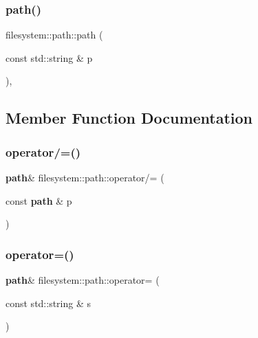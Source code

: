 \subsubsection{path()\hspace{0.1cm}{\footnotesize\ttfamily [2/2]}}
{\footnotesize\ttfamily filesystem\+::path\+::path (\begin{DoxyParamCaption}\item[{const std\+::string \&}]{p }\end{DoxyParamCaption})\hspace{0.3cm}{\ttfamily [inline]}, {\ttfamily [explicit]}}



\subsection{Member Function Documentation}
\mbox{\label{classfilesystem_1_1path_acfd0a349cb1c20ea2c65cc7325f456a0}} 
\subsubsection{operator/=()}
{\footnotesize\ttfamily \textbf{ path}\& filesystem\+::path\+::operator/= (\begin{DoxyParamCaption}\item[{const \textbf{ path} \&}]{p }\end{DoxyParamCaption})\hspace{0.3cm}{\ttfamily [inline]}}

\mbox{\label{classfilesystem_1_1path_aed7173cc676af0f678315750fb420ce9}} 
\subsubsection{operator=()\hspace{0.1cm}{\footnotesize\ttfamily [1/2]}}
{\footnotesize\ttfamily \textbf{ path}\& filesystem\+::path\+::operator= (\begin{DoxyParamCaption}\item[{const std\+::string \&}]{s }\end{DoxyParamCaption})\hspace{0.3cm}{\ttfamily [inline]}}

\mbox{\label{classfilesystem_1_1path_a791421870fb00d112d4cfd134be6fe14}} 
